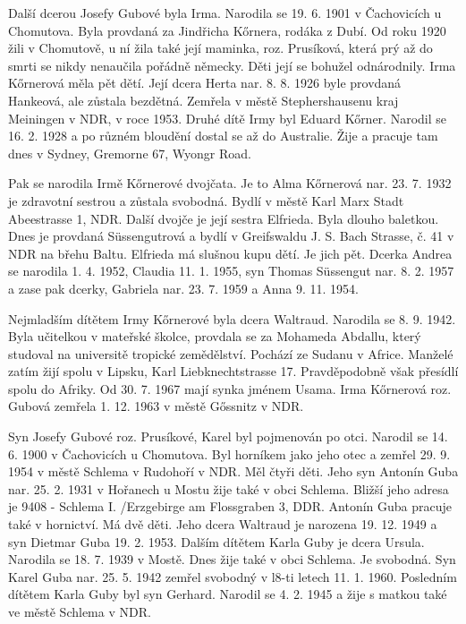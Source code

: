 \documentclass[../dejiny-rodu-prusiku.tex]{subfiles}
\begin{document}
Další dcerou Josefy Gubové byla Irma. Narodila se 19. 6. 1901 v Čachovicích u Chomutova. Byla provdaná za Jindřicha Kőrnera, rodáka z Dubí. Od roku 1920 žili v Chomutově, u ní žila také její maminka, roz. Prusíková, která prý až do smrti se nikdy nenaučila pořádně německy. Děti její se bohužel odnárodnily. Irma Kőrnerová měla pět dětí. Její dcera Herta nar. 8. 8. 1926 byle provdaná Hankeová, ale zůstala bezdětná. Zemřela v městě Stephershausenu kraj Meiningen v NDR, v roce 1953. Druhé dítě Irmy byl Eduard Kőrner. Narodil se 16. 2. 1928 a po různém bloudění dostal se až do Australie. Žije a pracuje tam dnes v Sydney, Gremorne 67, Wyongr Road.

Pak se narodila Irmě Kőrnerové dvojčata. Je to Alma Kőrnerová nar. 23. 7. 1932 je zdravotní sestrou a zůstala svo­bodná. Bydlí v městě Karl Marx Stadt Abeestrasse 1, NDR. Další dvojče je její sestra Elfrieda. Byla dlouho balet­kou. Dnes je provdaná Süssengutrová a bydlí v Greifswaldu J. S. Bach Strasse, č. 41 v NDR na břehu Baltu. Elfrieda má slušnou kupu dětí. Je jich pět. Dcerka Andrea se narodila 1. 4. 1952, Claudia 11. 1. 1955, syn Thomas Süssengut nar. 8. 2. 1957 a zase pak dcerky, Gabri­ela nar. 23. 7. 1959 a Anna 9. 11. 1954.

Nejmladším dítětem Irmy Kőrnerové byla dcera Waltraud. Narodila se 8. 9. 1942. Byla učitelkou v mateřské školce, provdala se za Mohameda Abdallu, který studoval na universitě tropické zemědělství. Pochází ze Sudanu v Africe. Manželé zatím žijí spolu v Lipsku, Karl Liebknechtstrasse 17. Pravděpodobně však přesídlí spolu do Afriky. Od 30. 7. 1967 mají synka jménem Usama. Irma Kőrnerová roz. Gubová zemřela 1. 12. 1963 v městě Gőssnitz v NDR.

Syn Josefy Gubové roz. Prusíkové, Karel byl pojmenován po otci. Narodil se 14. 6. 1900 v Čachovicích u Chomutova. Byl horníkem jako jeho otec a zemřel 29. 9. 1954 v městě Schlema v Rudohoří v NDR. Měl čtyři děti. Jeho syn Antonín Guba nar. 25. 2. 1931 v Hořanech u Mostu žije také v obci Schlema. Bližší jeho adresa je 9408 - Schlema I. /Erzgebirge am Flossgraben 3, DDR. Antonín Guba pracuje také v hornictví. Má dvě děti. Jeho dcera Waltraud je narozena 19. 12. 1949 a syn Dietmar Guba 19. 2. 1953.  Dalším dítětem Karla Guby je dcera Ursula. Narodila se 18. 7. 1939 v Mostě. Dnes žije také v obci Schlema. Je svobodná. Syn Karel Guba nar. 25. 5. 1942 zemřel svobodný v l8-ti letech 11. 1. 1960. Posledním dítětem Karla Guby byl syn Gerhard. Narodil se 4. 2. 1945 a žije s matkou ta­ké ve městě Schlema v NDR.
\end{document}
